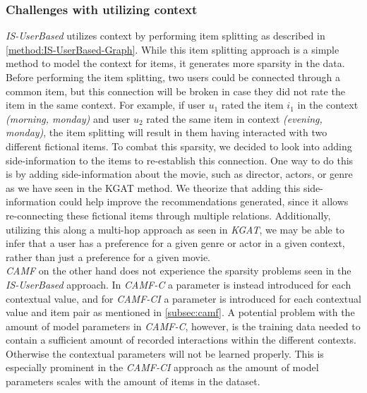 \subsubsection{Challenges with utilizing context}
\textit{IS-UserBased} utilizes context by performing item splitting as described in \autoref{method:IS-UserBased-Graph}.
While this item splitting approach is a simple method to model the context for items, it generates more sparsity in the data.
Before performing the item splitting, two users could be connected through a common item, but this connection will be broken in case they did not rate the item in the same context.
For example, if user $u_1$ rated the item $i_1$ in the context \textit{(morning, monday)} and user $u_2$ rated the same item in context \textit{(evening, monday)}, the item splitting will result in them having interacted with two different fictional items.
To combat this sparsity, we decided to look into adding side-information to the items to re-establish this connection.
One way to do this is by adding side-information about the movie, such as director, actors, or genre as we have seen in the KGAT method.
We theorize that adding this side-information could help improve the recommendations generated, since it allows re-connecting these fictional items through multiple relations.
Additionally, utilizing this along a multi-hop approach as seen in \textit{KGAT}, we may be able to infer that a user has a preference for a given genre or actor in a given context, rather than just a preference for a given movie.\\
\textit{CAMF} on the other hand does not experience the sparsity problems seen in the \textit{IS-UserBased} approach.
In \textit{CAMF-C} a parameter is instead introduced for each contextual value, and for \textit{CAMF-CI} a parameter is introduced for each contextual value and item pair as mentioned in \autoref{subsec:camf}.
A potential problem with the amount of model parameters in \textit{CAMF-C}, however, is the training data needed to contain a sufficient amount of recorded interactions within the different contexts. 
Otherwise the contextual parameters will not be learned properly.
This is especially prominent in the \textit{CAMF-CI} approach as the amount of model parameters scales with the amount of items in the dataset.


